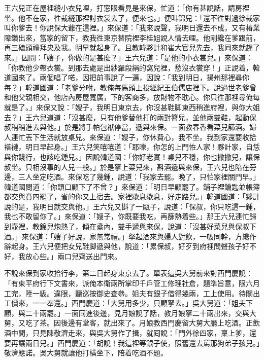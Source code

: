 王六兒正在屋裡縫小衣兒哩，打窓眼看見是來保，忙道：「你有甚說話，請房裡坐。他不在家，徃裁縫那裡討衣裳去了，便來也。」便叫錦兒：「還不徃對過徐裁家叫你爹去！你說保大爺在這裡。」{}來保道：「我來說聲，我明日還去不成，又有樁業障鑽出來，當家的留下，教我徃東京替院裡李桂姐說人情去哩。他剛纔在爹跟前，再三磕頭禮拜央及我。{}明早就起身了。且教韓夥計和崔大官兒先去，我囘來就趕了來。」因問：「嫂子，你做的是甚麼？」王六兒道：「是他的小衣裳兒。」來保道：「你教他少帶衣裳。到那去處是出紗羅段絹的窩兒裡，愁沒衣裳穿！」{}正說着，韓道國來了。兩個唱了喏，因把前事說了一遍，因說：「我到明日，揚州那裡尋你每？」韓道國道：「老爹分咐，教俺每馬頭上投經紀王伯儒店裡下。說過世老爹曾和他父親相交，他店內房屋寬廣，下的客商多，放財物不耽心。你只徃那裡尋俺每就是了。」來保又說：「嫂子，我明日東京去，你沒甚鞋脚東西稍進府裡，與你大姐去？」王六兒道道：「沒甚麼，只有他爹替他打的兩對簪兒，並他兩雙鞋，起動保叔稍稍進去與他。」於是將手帕包袱停當，遞與來保。一面教春香看菜兒篩酒。婦人連忙丟下生活就放桌兒。來保道：「嫂子，你休費心，我不坐。{}我到家還要收拾褡褳，明日早起身。」王六兒笑嘻嘻道：「耶嚛，你怎的上門恠人家！夥計家，自恁與你餞行，也該吃鍾兒。」因說韓道國：「你好老實！桌兒不穩，你也撒撒兒，讓保叔坐。只相沒事的人兒一般。」{}於是拏上菜兒來，斟酒遞與來保，王六兒也陪在旁邊，三人坐定吃酒。來保吃了幾鍾，說道：「我家去罷。晚了，只怕家裡關門早。」韓道國問道：「你頭口顧下了不曾？」來保道：「明日早顧罷了。鋪子裡鑰匙並帳簿都交與賁四罷了，省的你又上宿去。家裡歇息歇息，好走路兒。」韓道國道：「夥計說的是，我明日就交與他。」王六兒又斟了一甌子，說道：「保叔，你只吃這一鍾，我也不敢留你了。」來保道：「嫂子，你既要我吃，再篩熱着些。」{}那王六兒連忙歸到壺裡，教錦兒炮熱了，傾在盞內，雙手遞與來保，說道：「沒甚好菜兒與保叔下酒。」來保道：「嫂子好說，家無常禮。」拏起酒來與婦人對飲，一吸同幹，方纔作辭起身。王六兒便把女兒鞋脚遞與他，說道：「累保叔，好歹到府裡問聲孩子好不好，我放心些。」兩口兒齊送出門來。

不說來保到家收拾行李，第二日起身東京去了。單表這吳大舅前來對西門慶說：「有東平府行下文書來，派俺本衛兩所掌印千戶管工修理社倉，題準旨意，限六月工完，陞一級。違限，聽巡按御史查叅。姐夫有銀子借得幾兩，工上使用。待關出工價來，一一奉還。」西門慶道：「大舅用多少，只顧拏去。」吳大舅道：「姐夫下顧，與二十兩罷。」一面同進後邊，見月娘說了話，教月娘拏二十兩出來，交與大舅，又吃了茶。因後邊有堂客，就出來了。月娘教西門慶留大舅大廳上吃酒。正飲酒中間，只見陳敬濟走來，與吳大舅作了揖，就囘說：「門外徐四家，稟上爹，還要再讓兩日兒。」西門慶道：「胡說！我這裡等銀子使，照舊還去罵那狗弟子孩兒。」敬濟應諾。吳大舅就讓他打橫坐下，陪着吃酒不題。

